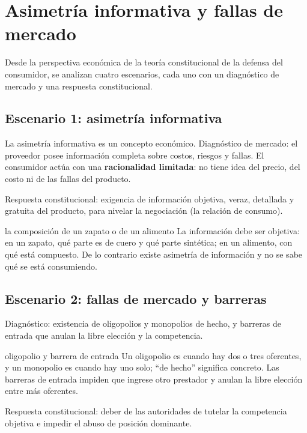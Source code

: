 \documentclass[12pt,oneside]{book}
\begin{document}
\section{Asimetr\'ia informativa y fallas de mercado}

Desde la perspectiva econ\'omica de la teor\'ia constitucional de la defensa del consumidor, se analizan cuatro escenarios, cada uno con un diagn\'ostico de mercado y una respuesta constitucional.

\subsection{Escenario 1: asimetr\'ia informativa}

La asimetr\'ia informativa es un concepto econ\'omico. Diagn\'ostico de mercado: el proveedor posee informaci\'on completa sobre costos, riesgos y fallas. El consumidor act\'ua con una \textbf{racionalidad limitada}: no tiene idea del precio, del costo ni de las fallas del producto.

Respuesta constitucional: exigencia de informaci\'on objetiva, veraz, detallada y gratuita del producto, para nivelar la negociaci\'on (la relaci\'on de consumo).

\begin{example}{la composici\'on de un zapato o de un alimento}
La informaci\'on debe ser objetiva: en un zapato, qu\'e parte es de cuero y qu\'e parte sint\'etica; en un alimento, con qu\'e est\'a compuesto. De lo contrario existe asimetr\'ia de informaci\'on y no se sabe qu\'e se est\'a consumiendo.
\end{example}

\subsection{Escenario 2: fallas de mercado y barreras}

Diagn\'ostico: existencia de oligopolios y monopolios de hecho, y barreras de entrada que anulan la libre elecci\'on y la competencia.

\begin{definition}{oligopolio y barrera de entrada}
Un oligopolio es cuando hay dos o tres oferentes, y un monopolio es cuando hay uno solo; ``de hecho'' significa concreto. Las barreras de entrada impiden que ingrese otro prestador y anulan la libre elecci\'on entre m\'as oferentes.
\end{definition}

Respuesta constitucional: deber de las autoridades de tutelar la competencia objetiva e impedir el abuso de posici\'on dominante.
\end{document}
